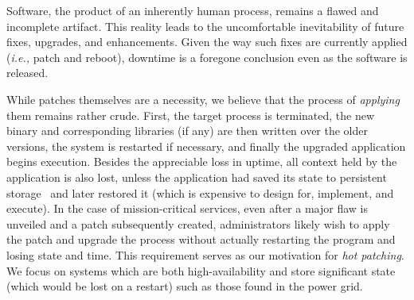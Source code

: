 %

Software, the product of an inherently human process, remains a flawed
and incomplete artifact.  This reality leads to the uncomfortable
inevitability of future fixes, upgrades, and enhancements.  Given the
way such fixes are currently applied ({\it i.e.,} patch and reboot),
downtime is a foregone conclusion even as the software is released.



While patches themselves are a necessity, we believe that the process
of {\it applying} them remains rather crude.  First, the target
process is terminated, the new binary and corresponding libraries (if
any) are then written over the older versions, the system is restarted
if necessary, and finally the upgraded application begins execution.
Besides the appreciable loss in uptime, all context held by the
application is also lost, unless the application had saved its
state to persistent storage~\cite{crashonly,brown02rewind} and
later restored it (which
is expensive to design for, implement, and execute).  In the case of
mission-critical services, even after a major flaw is unveiled and a
patch subsequently created, administrators likely wish to apply the
patch and upgrade the process without actually restarting the program
and losing state and time.  This requirement serves as our motivation
for {\it hot patching}. We focus on systems which are both
high-availability and store significant state (which would be lost on
a restart) such as those found in the power grid.

